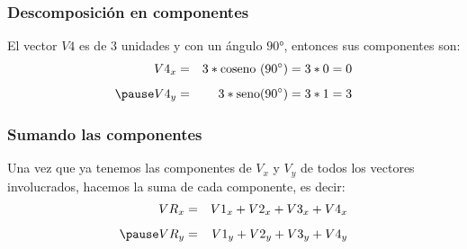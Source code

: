 \documentclass[14pt, xcolor={usenames,dvipsnames}]{beamer}
\begin{document}
\begin{frame}
\frametitle{Descomposición en componentes}
El vector $V4$ es de 3 unidades y con un ángulo $\ang{90}$, entonces sus componentes son:
\begin{eqnarray*}
V4_{x} &=& 3 * \text{coseno } (\ang{90}) = 3 * 0 =  0 \\[0.5em] \pause
V4_{y} &=& 3 * \text{seno} (\ang{90}) = 3 * 1 =  3
\end{eqnarray*}
\end{frame}
\begin{frame}
\frametitle{Sumando las componentes}
Una vez que ya tenemos las componentes de $V_{x}$ y $V_{y}$ de todos los vectores involucrados, hacemos la suma de cada componente, es decir:
\begin{eqnarray*}
VR_{x} &=& V1_{x} + V2_{x} + V3_{x} + V4_{x} \\[0.5em] \pause
VR_{y} &=& V1_{y} + V2_{y} + V3_{y} + V4_{y} 
\end{eqnarray*}
\end{frame}
\end{document}

